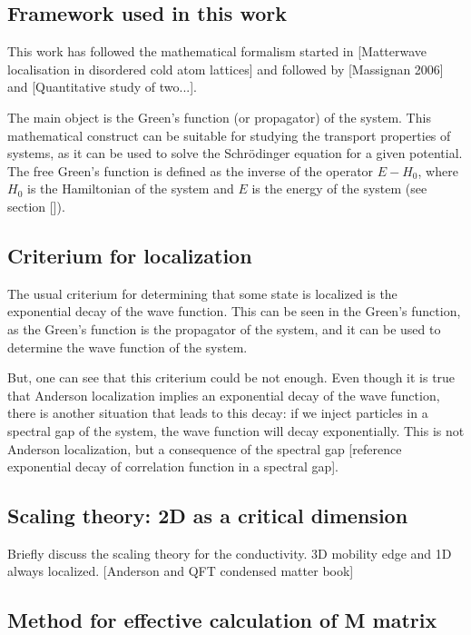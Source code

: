 

\subsection{Framework used in this work}

This work has followed the mathematical formalism started in [Matterwave localisation in disordered cold atom lattices] and followed by [Massignan 2006] and [Quantitative study of two...]. 

The main object is the Green's function (or propagator) of the system. This mathematical construct can be suitable for studying the transport properties of systems, as it can be used to solve the Schrödinger equation for a given potential. The free Green's function is defined as the inverse of the operator $E-H_0$, where $H_0$ is the Hamiltonian of the system and $E$ is the energy of the system (see section []). 

\subsection{Criterium for localization}

The usual criterium for determining that some state is localized is the exponential decay of the wave function. This can be seen in the Green's function, as the Green's function is the propagator of the system, and it can be used to determine the wave function of the system.

But, one can see that this criterium could be not enough. Even though it is true that Anderson localization implies an exponential decay of the wave function, there is another situation that leads to this decay: if we inject particles in a spectral gap of the system, the wave function will decay exponentially. This is not Anderson localization, but a consequence of the spectral gap [reference exponential decay of correlation function in a spectral gap].

\subsection{Scaling theory: 2D as a critical dimension}

Briefly discuss the scaling theory for the conductivity. 3D mobility edge and 1D always localized. [Anderson and QFT condensed matter book]

\subsection{Method for effective calculation of M matrix}


